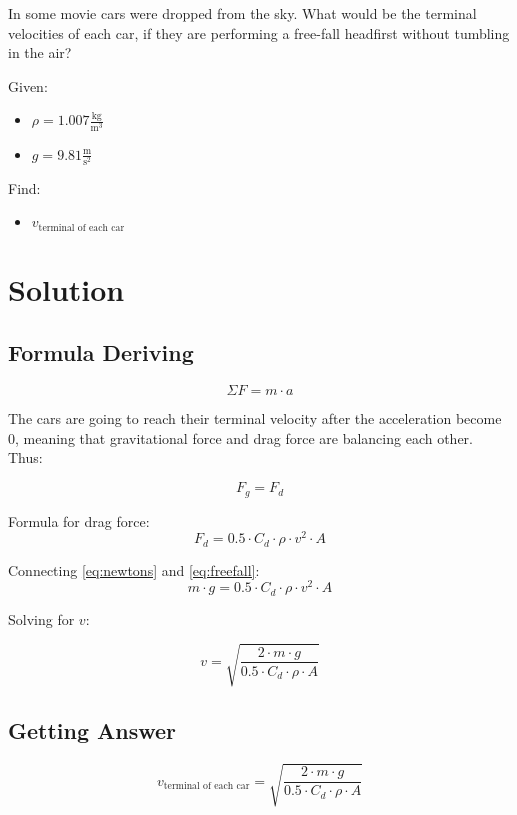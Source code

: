 
In some movie cars were dropped from the sky.
What would be the terminal velocities of each car, if they are
performing a free-fall headfirst without tumbling in the air?

\bigbreak Given:
\begin{itemize}
    \item $ \rho = 1.007 \frac{\text{kg}}{\text{m}^3} $
    \item $ g = 9.81 \frac{\text{m}}{\text{s}^2} $
\end{itemize}

Find:
\begin{itemize}
    \item $ v_{\text{terminal of each car}} $
\end{itemize}


\section*{Solution}
\subsection*{Formula Deriving}

\begin{equation}
    \label{eq:newtons}
    \Sigma F = m \cdot a
\end{equation}

The cars are going to reach their terminal velocity after the acceleration become 0,
meaning that gravitational force and drag force are balancing each other. Thus:

$$ F_g = F_d $$

Formula for drag force:
\begin{equation}
    \label{eq:freefall}
    F_d = 0.5 \cdot C_d \cdot \rho \cdot v^2 \cdot A
\end{equation}

Connecting \ref{eq:newtons} and \ref{eq:freefall}:
$$m \cdot g = 0.5 \cdot C_d \cdot \rho \cdot v^2 \cdot A $$

Solving for $v$:

\begin{equation}
    \label{eq:terminal}
    v = \sqrt{\frac{2 \cdot m \cdot g}{0.5 \cdot C_d \cdot \rho \cdot A}}
\end{equation}

\subsection*{Getting Answer}

\begin{equation}
    \label{eq:terminal}
    v_{\text{terminal of each car}} = \sqrt{\frac{2 \cdot m \cdot g}{0.5 \cdot C_d \cdot \rho \cdot A}}
\end{equation}
